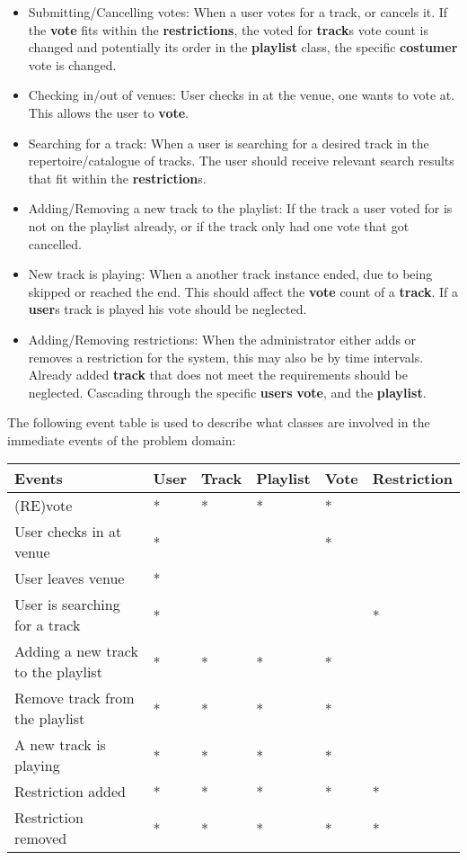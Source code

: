 \begin{itemize}
\item Submitting/Cancelling votes:
    When a user votes for a track, or cancels it. If the \textbf{vote} fits within the \textbf{restrictions}, the voted for \textbf{track}s vote count is changed and potentially its order in the \textbf{playlist} class, the specific \textbf{costumer} vote is changed.
\item Checking in/out of venues:
    User checks in at the venue, one wants to vote at. This allows the user to \textbf{vote}.
\item Searching for a track:
    When a user is searching for a desired track in the repertoire/catalogue of tracks. The user should receive relevant search results that fit within the \textbf{restriction}s.
\item Adding/Removing a new track to the playlist:
    If the track a user voted for is not on the playlist already, or if the track only had one vote that got cancelled.
\item New track is playing:
    When a another track instance ended, due to being skipped or reached the end. This should affect the \textbf{vote} count of a \textbf{track}. If a \textbf{user}s track is played his vote should be neglected.
\item Adding/Removing restrictions:
    When the administrator either adds or removes a restriction for the system, this may also be by time intervals. Already added \textbf{track} that does not meet the requirements should be neglected. Cascading through the specific \textbf{users} \textbf{vote}, and the \textbf{playlist}.
\end{itemize}

The following event table is used to describe what classes are involved in the immediate events of the problem domain:

\begin{center}
    \begin{tabular}{|l|l|l|l|l|l|}
    \hline
    \textbf{Events} & User & Track & Playlist & Vote & Restriction \\ \hline
    (RE)vote & * & * & * & * &   \\ \hline
    User checks in at venue & * &   &   & * &   \\ \hline
    User leaves venue & * &   &   &   &   \\ \hline
    User is searching for a track & * &   &   &  & * \\ \hline
    Adding a new track to the playlist & * & * & * & * &   \\ \hline
    Remove track from the playlist & * & * & * & * &   \\ \hline
    A new track is playing & * & * & * & * &   \\ \hline
    Restriction added & * & * & * & * & * \\ \hline
    Restriction removed & * & * & * & * & * \\ \hline
    \end{tabular}
\end{center}


